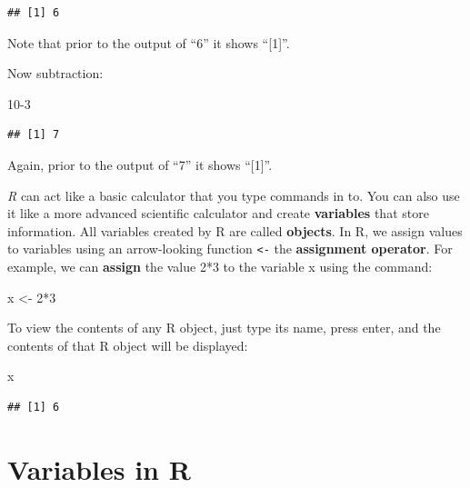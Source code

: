 \documentclass[
]{book}
\newenvironment{Shaded}{\begin{snugshade}}{\end{snugshade}}
\newcommand{\DecValTok}[1]{\textcolor[rgb]{0.00,0.00,0.81}{#1}}
\newcommand{\NormalTok}[1]{#1}
\newcommand{\OtherTok}[1]{\textcolor[rgb]{0.56,0.35,0.01}{#1}}
\newcommand{\SpecialCharTok}[1]{\textcolor[rgb]{0.00,0.00,0.00}{#1}}
\begin{document}
\begin{verbatim}
## [1] 6
\end{verbatim}

Note that prior to the output of ``6'' it shows ``{[}1{]}''.

Now subtraction:

\begin{Shaded}
\begin{Highlighting}[]
\DecValTok{10{-}3}
\end{Highlighting}
\end{Shaded}

\begin{verbatim}
## [1] 7
\end{verbatim}

Again, prior to the output of ``7'' it shows ``{[}1{]}''.

\emph{R} can act like a basic calculator that you type commands in to. You can also use it like a more advanced scientific calculator and create \textbf{variables} that store information. All variables created by R are called \textbf{objects}. In R, we assign values to variables using an arrow-looking function \texttt{\textless{}-} the \textbf{assignment operator}. For example, we can \textbf{assign} the value 2*3 to the variable x using the command:

\begin{Shaded}
\begin{Highlighting}[]
\NormalTok{x }\OtherTok{\textless{}{-}} \DecValTok{2}\SpecialCharTok{*}\DecValTok{3}
\end{Highlighting}
\end{Shaded}

To view the contents of any R object, just type its name, press enter, and the contents of that R object will be displayed:

\begin{Shaded}
\begin{Highlighting}[]
\NormalTok{x}
\end{Highlighting}
\end{Shaded}

\begin{verbatim}
## [1] 6
\end{verbatim}

\hypertarget{variables-in-r}{%
\section{Variables in R}\label{variables-in-r}}
\end{document}
